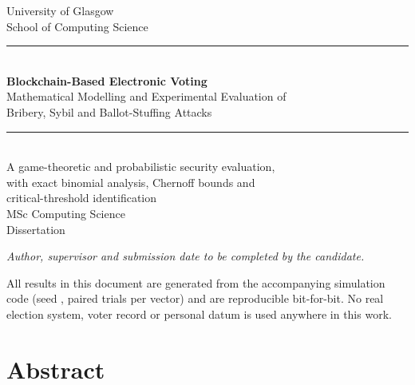 \documentclass[11pt,a4paper]{article}
\begin{document}
\begin{titlepage}
\thispagestyle{empty}
\centering
\vspace*{1.2cm}

{\sffamily\Large University of Glasgow}\\[2pt]
{\sffamily\normalsize School of Computing Science}\\[3.2cm]

{\color{rule}\rule{\textwidth}{0.9pt}}\\[0.7cm]
{\sffamily\LARGE\bfseries Blockchain-Based Electronic Voting}\\[0.42cm]
{\sffamily\Large Mathematical Modelling and Experimental Evaluation of}\\[0.18cm]
{\sffamily\Large Bribery, Sybil and Ballot-Stuffing Attacks}\\[0.7cm]
{\color{rule}\rule{\textwidth}{0.9pt}}\\[1.5cm]

{\large A game-theoretic and probabilistic security evaluation,}\\[3pt]
{\large with exact binomial analysis, Chernoff bounds and}\\[3pt]
{\large critical-threshold identification}\\[2.6cm]

{\sffamily\large MSc Computing Science}\\[0.35cm]
{\sffamily\normalsize Dissertation}\\[2.4cm]

\begin{minipage}{0.8\textwidth}
\centering
{\itshape Author, supervisor and submission date to be completed by the candidate.}
\end{minipage}

\vfill
{\footnotesize\color{inkmuted}
All results in this document are generated from the accompanying simulation code
(seed \Seed, \TotalTrials{} paired trials per vector) and are reproducible bit-for-bit.
No real election system, voter record or personal datum is used anywhere in this work.}
\end{titlepage}

\clearpage
\section*{Abstract}
\end{document}
